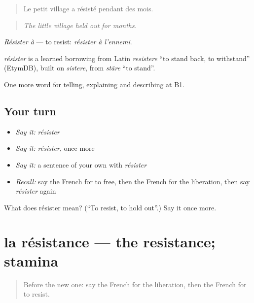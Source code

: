 \begin{quote}
Le petit village a résisté pendant des mois.
\end{quote}

\begin{quote}
\emph{The little village held out for months.}
\end{quote}

\emph{Résister à} — to resist: \emph{résister à l'ennemi}.

\begin{cousinweb}
\emph{résister} is a learned borrowing from Latin \emph{resistere} \textquotedblleft{}to stand back, to withstand\textquotedblright{} (EtymDB), built on \emph{sistere}, from \emph{stāre} \textquotedblleft{}to stand\textquotedblright{}.
\end{cousinweb}

\begin{grammarlens}[title={What you've built}]
One more word for telling, explaining and describing at B1.
\end{grammarlens}

\subsection*{Your turn}
\begin{itemize}
\raggedright
  \item \emph{Say it:} \emph{résister}
  \item \emph{Say it:} \emph{résister}, once more
  \item \emph{Say it:} a sentence of your own with \emph{résister}
  \item \emph{Recall:} say the French for to free, then the French for the liberation, then say \emph{résister} again
\end{itemize}

\begin{tcolorbox}[breakable,colback=teal!4,colframe=teal!35!black,title={Before you move on}]
What does résister mean? (\textquotedblleft{}To resist, to hold out\textquotedblright{}.) Say it once more.
\end{tcolorbox}
\section[la résistance]{la résistance — the resistance; stamina}

\label{lesson:FR-C326-resistance}



\begin{quote}
Before the new one: say the French for the liberation, then the French for to resist.
\end{quote}

